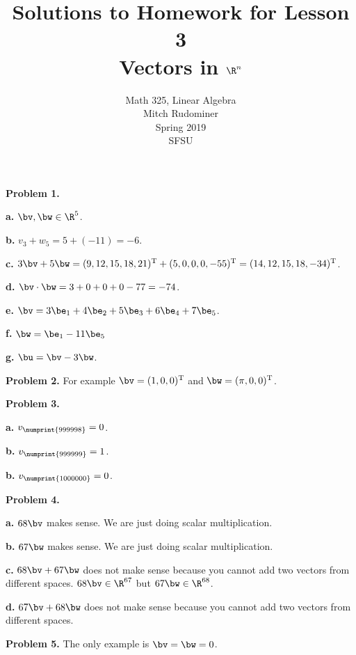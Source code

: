 \documentclass[oneside,12pt]{amsart}
\begin{document}
\title{Solutions to Homework for Lesson 3 \\ Vectors in $\R^n$}
\author{Math 325, Linear Algebra \\ Mitch Rudominer \\ Spring 2019 \\ SFSU }
\date{}

\maketitle


\textbf{Problem 1.}

\textbf{a.} $\bv, \bw \in \R^5$.

\textbf{b.} $v_3 + w_5 = 5 + (-11) = -6$.

\textbf{c.} $3 \bv + 5 \bw = (9, 12, 15, 18, 21)^{\text{T}} + (5, 0, 0, 0, -55)^{\text{T}} = (14, 12, 15, 18, -34)^{\text{T}}$.

\textbf{d.} $\bv \cdot \bw = 3 + 0 + 0 + 0 - 77 = -74$.


\textbf{e.} $\bv = 3\be_1 + 4\be_2 + 5\be_3 +6\be_4 + 7\be_5$.

\textbf{f.} $\bw = \be_1 - 11\be_5$

\textbf{g.} $\bu = \bv - 3\bw$.

\smallskip

\textbf{Problem 2.} For example $\bv = (1, 0, 0)^{\text{T}}$ and $\bw = (\pi, 0, 0)^{\text{T}}$.

\smallskip

\textbf{Problem 3.}

\textbf{a.} $v_{\numprint{999998}} = 0$.

\textbf{b.} $v_{\numprint{999999}} = 1$.

\textbf{b.} $v_{\numprint{1000000}} = 0$.

\smallskip

\textbf{Problem 4.}

\textbf{a.} $68 \bv$ makes sense. We are just doing scalar multiplication.

\textbf{b.} $67 \bw$ makes sense. We are just doing scalar multiplication.

\textbf{c.} $68 \bv + 67 \bw$ does not make sense because you cannot add
two vectors from different spaces. $68 \bv \in \R^{67}$ but
$67 \bw \in \R^{68}$.


\textbf{d.} $67 \bv + 68 \bw$ does not make sense because you cannot add two
vectors from different spaces.


\smallskip

\textbf{Problem 5.} The only example is $\bv = \bw = 0$.
\end{document}
